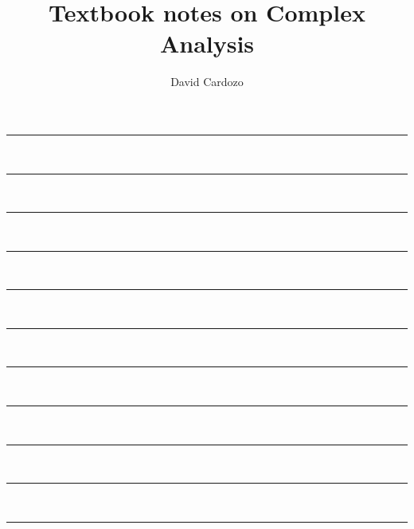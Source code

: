 \documentclass[notitlepage]{article}
\author{David Cardozo}
\title{Textbook notes on Complex Analysis}
\begin{document}





\noindent\rule{\textwidth}{1pt}\\[-0.1cm]



\noindent\rule{\textwidth}{1pt}\\[-0.1cm]



\noindent\rule{\textwidth}{1pt}\\[-0.1cm]



\noindent\rule{\textwidth}{1pt}\\[-0.1cm]



\noindent\rule{\textwidth}{1pt}\\[-0.1cm]



\noindent\rule{\textwidth}{1pt}\\[-0.1cm]



\noindent\rule{\textwidth}{1pt}\\[-0.1cm]



\noindent\rule{\textwidth}{1pt}\\[-0.1cm]



\noindent\rule{\textwidth}{1pt}\\[-0.1cm]



\noindent\rule{\textwidth}{1pt}\\[-0.1cm]



\noindent\rule{\textwidth}{1pt}\\[-0.1cm]


\end{document}
